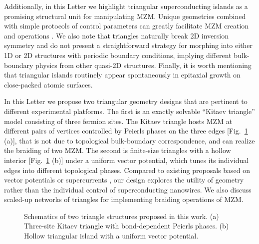 Additionally, in this Letter we highlight triangular superconducting islands as a promising structural unit for manipulating MZM. Unique geometries combined with simple protocols of control parameters can greatly facilitate MZM creation and operations \cite{liManipulatingMajoranaZero2016, pahomiBraidingMajoranaCorner2020, zhangsb_2020_1, zhangsb_2020_2}. We also note that triangles naturally break 2D inversion symmetry and do not present a straightforward strategy for morphing into either 1D or 2D structures with periodic boundary conditions, implying different bulk-boundary physics from other quasi-2D structures. Finally, it is worth mentioning that triangular islands routinely appear spontaneously in epitaxial growth \cite{pietzschSpinResolvedElectronicStructure2006} on close-packed atomic surfaces.

In this Letter we propose two triangular geometry designs that are pertinent to different experimental platforms. The first is an exactly solvable ``Kitaev triangle'' model consisting of three fermion sites. The Kitaev triangle hosts MZM at different pairs of vertices controlled by Peierls phases on the three edges [Fig.~\ref{fig:triangles} (a)], that is not due to topological bulk-boundary correspondence, and can realize the braiding of two MZM. The second is finite-size triangles with a hollow interior [Fig.~\ref{fig:triangles} (b)] under a uniform vector potential, which tunes its individual edges into different topological phases. Compared to existing proposals based on vector potentials or supercurrents \cite{romitoManipulatingMajoranaFermions2012,takasanSupercurrentinducedTopologicalPhase2022,Hyart_2013,Dmytruk_2019}, our design explores the utility of geometry rather than the individual control of superconducting nanowires. We also discuss scaled-up networks of triangles for implementing braiding operations of MZM.

\begin{figure}[ht]
  \hspace{-18pt}
  \caption{Schematics of two triangle structures proposed in this work. (a) Three-site Kitaev triangle with bond-dependent Peierls phases. (b) Hollow triangular island with a uniform vector potential.}
  \label{fig:triangles}
\end{figure}

